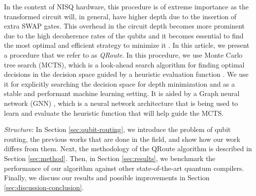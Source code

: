 \documentclass[%
 reprint,
amsmath,amssymb,
pra,
]{revtex4-2}
\begin{document}
In the context of NISQ hardware, this procedure is of extreme importance as the transformed circuit will, in general, have higher depth due to the insertion of extra SWAP gates. This overhead in the circuit depth becomes more prominent due to the high decoherence rates of the qubits and it becomes essential to find the most optimal and efficient strategy to minimize it \citep{qroute_tket, qroute_dqn1, qroute_dqn2}. In this article, we present a procedure that we refer to as \textit{QRoute}. In this procedure, we use Monte Carlo tree search (MCTS), which is a look-ahead search algorithm for finding optimal decisions in the decision space guided by a heuristic evaluation function \citep{mcts_bandit_1, mcts_bandit_2, mcts_uct}. We use it for explicitly searching the decision space for depth minimization and as a stable and performant machine learning setting. It is aided by a Graph neural network (GNN) \citep{nn_edge_conv}, which is a neural network architecture that is being used to learn and evaluate the heuristic function that will help guide the MCTS.

\textit{Structure}: In Section \ref{sec:qubit-routing}, we introduce the problem of qubit routing, the previous works that are done in the field, and show how our work differs from them. Next, the methodology of the QRoute algorithm is described in Section \ref{sec:method}. Then, in Section \ref{sec:results}, we benchmark the performance of our algorithm against other state-of-the-art quantum compilers. Finally, we discuss our results and  possible improvements in Section \ref{sec:discussion-conclusion}.
\end{document}
